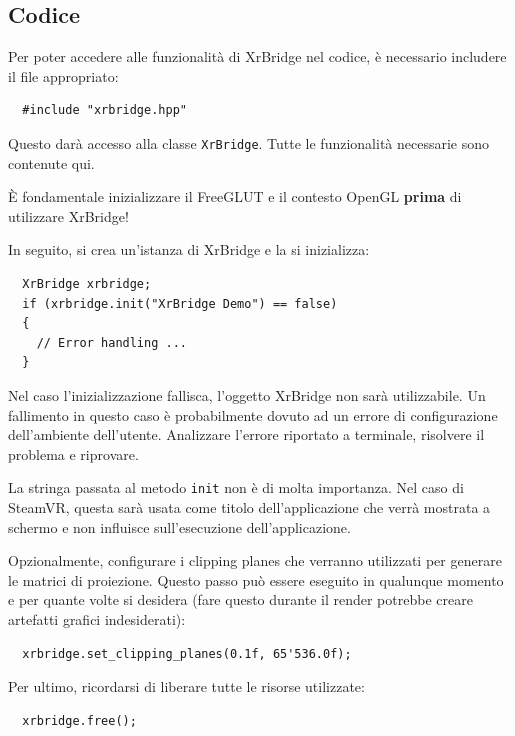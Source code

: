 \documentclass[twoside]{supsistudent}
\begin{document}
\subsection{Codice}

Per poter accedere alle funzionalità di XrBridge nel codice, è necessario includere il file appropriato:

\begin{verbatim}
  #include "xrbridge.hpp"
\end{verbatim}

Questo darà accesso alla classe \texttt{XrBridge}. Tutte le funzionalità necessarie sono contenute qui.

È fondamentale inizializzare il FreeGLUT e il contesto OpenGL \textbf{prima} di utilizzare XrBridge!

In seguito, si crea un'istanza di XrBridge e la si inizializza:

\begin{verbatim}
  XrBridge xrbridge;
  if (xrbridge.init("XrBridge Demo") == false)
  {
    // Error handling ...
  }
\end{verbatim}

Nel caso l'inizializzazione fallisca, l'oggetto XrBridge non sarà utilizzabile. Un fallimento in questo caso è probabilmente dovuto ad un errore di configurazione dell'ambiente dell'utente. Analizzare l'errore riportato a terminale, risolvere il problema e riprovare.

La stringa passata al metodo \texttt{init} non è di molta importanza. Nel caso di SteamVR, questa sarà usata come titolo dell'applicazione che verrà mostrata a schermo e non influisce sull'esecuzione dell'applicazione.

Opzionalmente, configurare i clipping planes che verranno utilizzati per generare le matrici di proiezione. Questo passo può essere eseguito in qualunque momento e per quante volte si desidera (fare questo durante il render potrebbe creare artefatti grafici indesiderati):

\begin{verbatim}
  xrbridge.set_clipping_planes(0.1f, 65'536.0f);
\end{verbatim}


Per ultimo, ricordarsi di liberare tutte le risorse utilizzate:

\begin{verbatim}
  xrbridge.free();
\end{verbatim}
\end{document}
